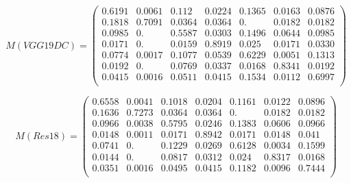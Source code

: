 \documentclass[journal, onecolumn]{IEEEtran}
\begin{document}
\begin{equation}
\label{eq:conf-VGG19-DC}
M(VGG19DC)=
\left(
  \begin{array}{ccccccc}
    0.6191&0.0061&0.112&0.0224&0.1365&0.0163&0.0876\\
    0.1818&0.7091&0.0364&0.0364&0.&0.0182&0.0182\\
    0.0985&0.&0.5587&0.0303&0.1496&0.0644&0.0985\\
    0.0171&0.&0.0159&0.8919&0.025&0.0171&0.0330\\
    0.0774&0.0017&0.1077&0.0539&0.6229&0.0051&0.1313\\
    0.0192&0.&0.0769&0.0337&0.0168&0.8341&0.0192\\
    0.0415&0.0016&0.0511&0.0415&0.1534&0.0112&0.6997\\
      \end{array}
\right)
\end{equation}

\begin{equation}
\label{eq:conf-Res18}
M(Res18)=
\left(
  \begin{array}{ccccccc}
    0.6558&0.0041&0.1018&0.0204&0.1161&0.0122&0.0896\\
    0.1636&0.7273&0.0364&0.0364&0.&0.0182&0.0182\\
    0.0966&0.0038&0.5795&0.0246&0.1383&0.0606&0.0966\\
    0.0148&0.0011&0.0171&0.8942&0.0171&0.0148&0.041\\
    0.0741&0.&0.1229&0.0269&0.6128&0.0034&0.1599\\
    0.0144&0.&0.0817&0.0312&0.024&0.8317&0.0168\\
    0.0351&0.0016&0.0495&0.0415&0.1182&0.0096&0.7444\\
      \end{array}
\right)
\end{equation}
\end{document}

